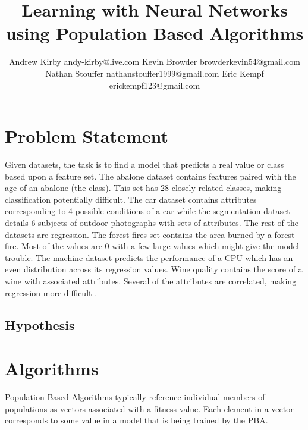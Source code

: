 \documentclass[twoside,10pt]{article}
\begin{document}
\title{Learning with Neural Networks using Population Based Algorithms}

\author{\name Andrew Kirby \email andy-kirby@live.com \AND
		\name Kevin Browder \email browderkevin54@gmail.com \AND
		\name Nathan Stouffer \email nathanstouffer1999@gmail.com \AND
		\name Eric Kempf \email erickempf123@gmail.com }

\maketitle

\begin{abstract}

\end{abstract}


\section{Problem Statement}

	Given datasets, the task is to find a model that predicts a real value or class based upon a feature set. The abalone dataset contains features paired with the age of an abalone (the class). This set has 28 closely related classes, making classification potentially difficult.
	The car dataset contains attributes corresponding to 4 possible conditions of a car while the segmentation dataset details 6 subjects of outdoor photographs with sets of attributes.
	The rest of the datasets are regression.
	The forest fires set contains the area burned by a forest fire. Most of the values are 0 with a few large values which might give the model trouble.
	The machine dataset predicts the performance of a CPU which has an even distribution across its regression values. Wine quality contains the score of a wine with associated attributes. Several of the attributes are correlated, making regression more difficult \citep{datasets}.

\subsection{Hypothesis}

\section{Algorithms}

	Population Based Algorithms typically reference individual members of populations as vectors associated with a fitness value. Each element in a vector corresponds to some value in a model that is being trained by the PBA.
	
\end{document}
